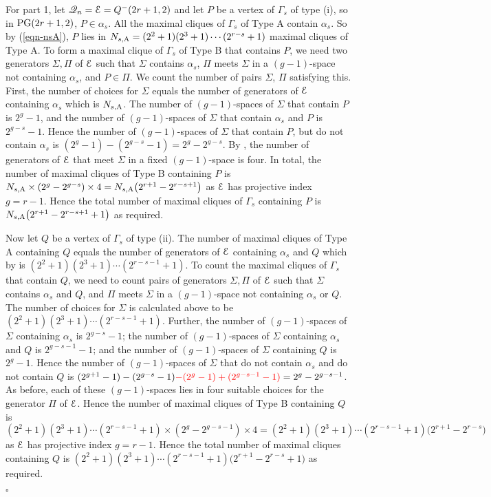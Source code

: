 \documentclass[12pt]{article}
\newenvironment{proof}{\noindent{\bf Proof}\hspace{0.5em}}
    { \null  \hfill $\square$ \par}
\newcommand\E{{\cal E}}
\newcommand{\Q}{\mathscr Q}
\newcommand\PG{{\rm PG}}
\newcommand\red[1]{{\color{red} #1}}
\begin{document}
\begin{proof}
For part 1, let $\Q_n=\E=Q^-(2r+1,2)$ and let $P$ be a vertex of $\Gamma_s$ of type (i), so in $\PG(2r+1,2)$, $P\in\alpha_s$. All the maximal cliques of $\Gamma_s$ of Type A
contain $\alpha_s$. So by (\ref{eqn-nsA}), $P$ lies in $N_{s,{\rm A}}=(2^2+1)(2^3+1)\cdots(2^{r-s}+1)$ maximal cliques of Type A. To form a maximal clique of $\Gamma_s$ of Type B that contains $P$, we need two generators $\Sigma,\Pi$ of $\E$ such that $\Sigma$ contains $\alpha_s$, $\Pi$ meets $\Sigma$ in a $(g-1)$-space not containing $\alpha_s$, and $P\in\Pi$. We count the number of pairs $\Sigma$, $\Pi$ satisfying this. First, the number of choices for $\Sigma$ equals the number of generators of $\E$ containing $\alpha_s$ which is $N_{s,{\rm A}}$. The number of $(g-1)$-spaces of $\Sigma$ that contain $P$ is $2^g-1$, and the number of $(g-1)$-spaces of $\Sigma$ that contain $\alpha_s$ and $P$ is $2^{g-s}-1$. Hence the number of $(g-1)$-spaces of $\Sigma$ that contain $P$, but do not contain $\alpha_s$ is $(2^g-1)-(2^{g-s}-1)=2^g-2^{g-s}$. By \cite[Lemma 22.4.8]{HT}, the number of generators of $\E$ that meet $\Sigma$ in a fixed $(g-1)$-space is four.  In total, the number of maximal cliques of Type B containing $P$ is $N_{s,{\rm A}}\times(2^g-2^{g-s})\times4=N_{s,{\rm A}}\big(2^{r+1}-2^{r-s+1}\big)$ as $\E$ has projective index $g=r-1$. Hence the total number of maximal cliques of $\Gamma_s$ containing 
$P$ is $N_{s,{\rm A}}\big(2^{r+1}-2^{r-s+1}+1\big)$ as required.

Now let $Q$ be   a vertex of $\Gamma_s$  of type (ii). The number of maximal cliques of Type A containing $Q$ equals the number of generators of $\E$ containing $\alpha_s$ and $Q$ which by \cite[Theorem 22.4.7]{HT} is  $(2^2+1)(2^3+1)\cdots(2^{r-s-1}+1)$. To count the maximal cliques of $\Gamma_s$ that contain $Q$, we need to count pairs of generators $\Sigma,\Pi$ of $\E$ such that $\Sigma$ contains $\alpha_s$ and $Q$, and $\Pi$ meets $\Sigma$ in a $(g-1)$-space not containing $\alpha_s$ or $Q$.
The number of choices for $\Sigma$ is calculated above to be $(2^2+1)(2^3+1)\cdots(2^{r-s-1}+1)$. Further, the number of $(g-1)$-spaces of $\Sigma$ containing $\alpha_s$ is $2^{g-s}-1$; 
the number of $(g-1)$-spaces of $\Sigma$ containing $\alpha_s$ and $Q$ is $2^{g-s-1}-1$; and 
the number of $(g-1)$-spaces of $\Sigma$ containing $Q$ is $2^{g}-1$.
Hence the number of $(g-1)$-spaces of $\Sigma$ that do not contain $\alpha_s$ \red{and do not contain} $Q$ is $(2^{g+1}-1)-(2^{g-s}-1)\red{-(2^g-1)+(2^{g-s-1}-1)}=2^g-2^{g-s-1}$. As before, each of these $(g-1)$-spaces lies in  four suitable choices for the generator $\Pi$ of $\E$. Hence the number of maximal cliques of Type B containing $Q$ is  $(2^2+1)(2^3+1)\cdots(2^{r-s-1}+1)\times (2^g-2^{g-s-1})\times 4 = (2^2+1)(2^3+1)\cdots(2^{r-s-1}+1)\big(2^{r+1}-2^{r-s}\big)$ as $\E$ has projective index $g=r-1$. Hence the total number of maximal cliques containing $Q$ is 
$(2^2+1)(2^3+1)\cdots(2^{r-s-1}+1)\big(2^{r+1}-2^{r-s}+1\big)$ as required.


\end{proof}
\end{document}

